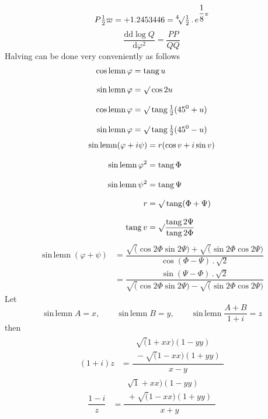 \[
P\tfrac12\varpi=+1.2453446
={}^{4}\!\surd\tfrac12\, .\,e^{\dfrac18\pi}
\]
\[
\dfrac{\mathrm d\mathrm d\log Q}{\mathrm d\varphi^2}=\dfrac{PP}{QQ}
\]
Halving can be done very conveniently as follows
\[
\begin{aligned}
\operatorname{cos\,lemn}\varphi&=\operatorname{tang}u\\[8pt]
\operatorname{sin\,lemn}\varphi&=\surd\cos2u\\[8pt]
\operatorname{cos\,lemn}\varphi&=\surd\operatorname{tang}\tfrac12(45^0+u)\\[8pt]
\operatorname{sin\,lemn}\varphi&=\surd\operatorname{tang}\tfrac12(45^0-u)
\end{aligned}
\]
\[
\begin{aligned}
\operatorname{sin\,lemn}(\varphi+i\psi)&=r(\cos v+i\sin v)\\[8pt]
\operatorname{sin\,lemn}\varphi^2&=\operatorname{tang}\Phi\\[8pt]
\operatorname{sin\,lemn}\psi^2&=\operatorname{tang}\Psi\\[8pt]
r&=\surd\operatorname{tang}(\Phi+\Psi)\\[8pt]
\operatorname{tang}v&=\surd\dfrac{\operatorname{tang}2\Psi}{\operatorname{tang}2\Phi}
\end{aligned}
\]
\[
\begin{aligned}
\operatorname{sin\,lemn}(\varphi+\psi)
&=\dfrac{\surd(\cos2\Phi\sin2\Psi)+\surd(\sin2\Phi\cos2\Psi)}{\cos(\Phi-\Psi)\, .\,\surd2}\\[8pt]
&=\dfrac{\sin(\Psi-\Phi)\, .\,\surd2}{\surd(\cos2\Phi\sin2\Psi)-\surd(\sin2\Phi\cos2\Psi)}
\end{aligned}
\]
Let
\[
\operatorname{sin\,lemn}A=x,\qquad
\operatorname{sin\,lemn}B=y,\qquad
\operatorname{sin\,lemn}\dfrac{A+B}{1+i}=z
\]
then
\[
\begin{aligned}(1+i)z&=\dfrac{\begin{gathered}\surd(1+xx)(1-yy)\\[3pt]{}-\surd(1-xx)(1+yy)\end{gathered}}{x-y}\end{aligned}
\]
\[
\begin{aligned}\dfrac{1-i}{z}&=\dfrac{\begin{gathered}\surd1+xx)(1-yy)\\[3pt]{}+\surd(1-xx)(1+yy)\end{gathered}}{x+y}\end{aligned}
\]
